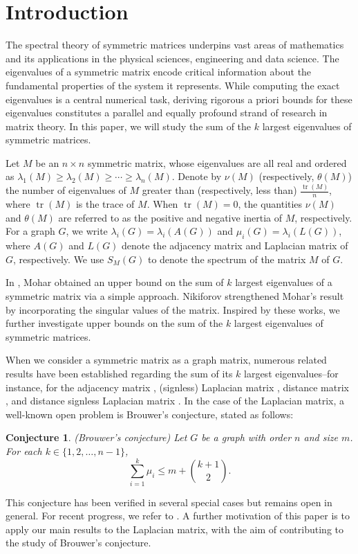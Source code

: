 \documentclass[12pt]{article}
\newtheorem{conjecture}[theorem]{Conjecture}
\begin{document}
 \baselineskip=0.30in

 \section{Introduction}
 The spectral theory of symmetric matrices underpins vast areas of
 mathematics and its applications in the physical sciences, engineering and data
 science. The eigenvalues of a symmetric matrix  encode critical information about the fundamental properties of the system it represents.
 While computing the exact eigenvalues is a central numerical task, deriving rigorous a priori bounds for these eigenvalues constitutes
 a parallel and equally profound strand of research in matrix
 theory. In this paper, we will study the sum of the $k$ largest
 eigenvalues of symmetric matrices.

 Let $M$ be an $n\times n$ symmetric matrix, whose eigenvalues are all real and ordered as $\lambda_1(M) \geq \lambda_2(M) \geq \cdots \geq \lambda_n(M)$.
  Denote by $\nu(M)$ (respectively, $\theta(M)$) the number of eigenvalues of $M$ greater than (respectively, less than)
  $\frac{\operatorname{tr}(M)}{n}$, where $\operatorname{tr}(M)$ is the trace of $M$. When $\operatorname{tr}(M) = 0$, the quantities $\nu(M)$ and $\theta(M)$ are referred to as the positive and negative inertia of $M$, respectively.
  For a graph $G$, we write $\lambda_i(G) = \lambda_i(A(G))$ and $\mu_i(G) = \lambda_i(L(G))$, where $A(G)$ and $L(G)$ denote the adjacency matrix and Laplacian matrix of $G$, respectively. We use $S_M(G)$ to denote the spectrum of the matrix $M$ of $G$.

 In \cite{MOHAR}, Mohar obtained an upper bound on the sum of $k$ largest
 eigenvalues of a symmetric matrix via a simple approach. Nikiforov
 \cite{NIK2} strengthened Mohar's result by incorporating the singular values of
 the matrix. Inspired by these works, we further investigate upper bounds on the sum of the $k$ largest eigenvalues of symmetric matrices.

 When we consider a symmetric matrix as a graph matrix, numerous related results have been established regarding the sum of
 its $k$ largest eigenvalues--for instance, for the adjacency matrix \cite{DMS,MOHAR,NIK2}, (signless) Laplacian matrix \cite{AOT,LG}, distance matrix \cite{ZL}, and distance signless Laplacian matrix \cite{DP1}.
 In the case of the Laplacian matrix, a well-known open problem is Brouwer's conjecture, stated as follows:
  \begin{conjecture}  \label{conj1} {\rm (Brouwer's conjecture) \cite{E}}
 Let $G$ be a graph with order $n$ and size $m$. For each $k\in\{1,2,\dots,n-1\}$,
  $$\sum_{i=1}^{k}\mu_i\leq m+\binom{k+1}{2}.$$
  \end{conjecture}
 This conjecture has been verified in several special cases but remains open in general. For recent progress, we refer to \cite{CZ}. A further motivation of this paper is to apply our main
 results to the Laplacian matrix, with the aim of contributing to the study of Brouwer's conjecture.
\end{document}
